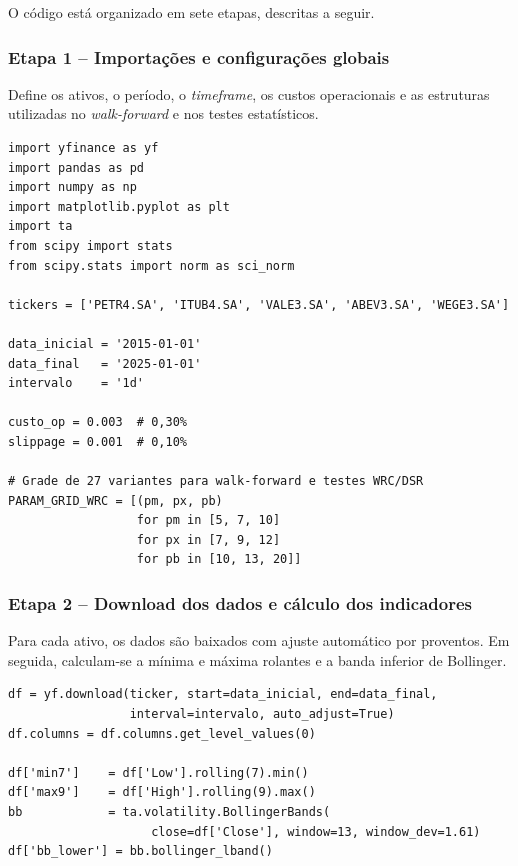 \documentclass[a4paper,10pt]{article}
\begin{document}
\noindent O código está organizado em sete etapas, descritas a seguir.

\subsubsection*{Etapa 1 -- Importações e configurações globais}

Define os ativos, o período, o \textit{timeframe}, os custos operacionais e as estruturas utilizadas no \textit{walk-forward} e nos testes estatísticos.

\begin{lstlisting}[caption={Bibliotecas e parâmetros globais.}]
import yfinance as yf
import pandas as pd
import numpy as np
import matplotlib.pyplot as plt
import ta
from scipy import stats
from scipy.stats import norm as sci_norm

tickers = ['PETR4.SA', 'ITUB4.SA', 'VALE3.SA', 'ABEV3.SA', 'WEGE3.SA']

data_inicial = '2015-01-01'
data_final   = '2025-01-01'
intervalo    = '1d'

custo_op = 0.003  # 0,30%
slippage = 0.001  # 0,10%

# Grade de 27 variantes para walk-forward e testes WRC/DSR
PARAM_GRID_WRC = [(pm, px, pb)
                  for pm in [5, 7, 10]
                  for px in [7, 9, 12]
                  for pb in [10, 13, 20]]
\end{lstlisting}

\subsubsection*{Etapa 2 -- Download dos dados e cálculo dos indicadores}

Para cada ativo, os dados são baixados com ajuste automático por proventos. Em seguida, calculam-se a mínima e máxima rolantes e a banda inferior de Bollinger.

\begin{lstlisting}[caption={Download dos dados e cálculo dos indicadores.}]
df = yf.download(ticker, start=data_inicial, end=data_final,
                 interval=intervalo, auto_adjust=True)
df.columns = df.columns.get_level_values(0)

df['min7']    = df['Low'].rolling(7).min()
df['max9']    = df['High'].rolling(9).max()
bb            = ta.volatility.BollingerBands(
                    close=df['Close'], window=13, window_dev=1.61)
df['bb_lower'] = bb.bollinger_lband()
\end{lstlisting}
\end{document}
